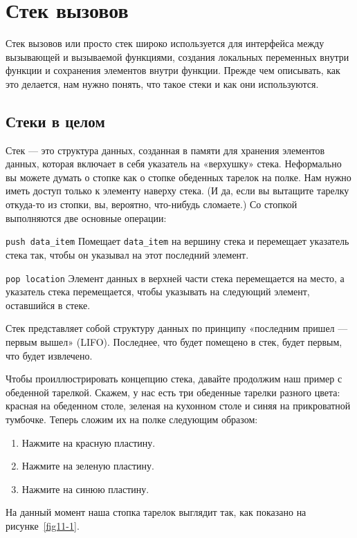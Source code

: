 \section{Стек вызовов}

Стек вызовов или просто стек широко используется для интерфейса между вызывающей и вызываемой функциями, создания локальных переменных внутри функции и сохранения элементов внутри функции. Прежде чем описывать, как это делается, нам нужно понять, что такое стеки и как они используются.

\subsection{Стеки в целом}

Стек — это структура данных, созданная в памяти для хранения элементов данных, которая включает в себя указатель на «верхушку» стека. Неформально вы можете думать о стопке как о стопке обеденных тарелок на полке. Нам нужно иметь доступ только к элементу наверху стека. (И да, если вы вытащите тарелку откуда-то из стопки, вы, вероятно, что-нибудь сломаете.) Со стопкой выполняются две основные операции:

\verb|push data_item| Помещает \verb|data_item| на вершину стека и перемещает указатель стека так, чтобы он указывал на этот последний элемент.

\verb|pop location| Элемент данных в верхней части стека перемещается на место, а указатель стека перемещается, чтобы указывать на следующий элемент, оставшийся в стеке.

Стек представляет собой структуру данных по принципу «последним пришел — первым вышел» (LIFO). Последнее, что будет помещено в стек, будет первым, что будет извлечено.

Чтобы проиллюстрировать концепцию стека, давайте продолжим наш пример с обеденной тарелкой. Скажем, у нас есть три обеденные тарелки разного цвета: красная на обеденном столе, зеленая на кухонном столе и синяя на прикроватной тумбочке. Теперь сложим их на полке следующим образом:

\begin{enumerate}
    \item Нажмите на красную пластину.
    \item Нажмите на зеленую пластину.
    \item Нажмите на синюю пластину.
\end{enumerate}

На данный момент наша стопка тарелок выглядит так, как показано на рисунке~\ref{fig11-1}.

